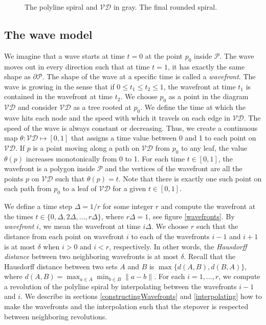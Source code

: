 \documentclass[3p]{elsarticle}
\newcommand{\VD}{\mathcal{VD}}
\newcommand{\PP}{\mathcal{P}}
\newcommand{\stepover}{\delta}
\newcommand{\tStepover}{\Delta}
\begin{document}
\begin{figure*}
\centering
{}\quad
{}
\caption{
 The polyline spiral and $\VD$ in gray.
 The final rounded spiral.
}
\label{firstSpirals}
\end{figure*}

\subsection{The wave model}\label{waveModel}

We imagine that a wave starts at time $t=0$ at the point $p_0$ inside $\PP$. The wave moves out
in every direction such that at time $t=1$, it has exactly the same shape as $\partial\PP$.
The shape of the wave at a specific time is called a \emph{wavefront}.
The wave is growing in the sense that if $0\leq t_1\leq t_2\leq 1$,
the wavefront at time $t_1$ is contained in the wavefront at time $t_2$.
We choose $p_0$ as a point in the diagram $\VD$ and consider $\VD$ as a tree
rooted at $p_0$. We define the time
at which the wave hits each node and the speed with which it travels on each edge in $\VD$.
The speed of the wave is always constant or decreasing.
Thus, we create a continuous map $\theta:\VD\mapsto [0,1]$ that assigns
a time value between 0 and 1 to each point on $\VD$. If $p$ is a point moving along a path
on $\VD$ from $p_0$ to any leaf,
the value $\theta(p)$ increases monotonically from 0 to 1.
For each time $t\in[0,1]$, the wavefront is a polygon inside $\PP$ and the vertices of the wavefront
are all the points $p$ on $\VD$ such that $\theta(p)=t$. Note that there is exactly one such point
on each path from $p_0$ to a leaf of $\VD$ for a given $t\in [0,1]$.

We define a time step $\tStepover = 1/r$ for some
integer $r$ and compute the wavefront at the times
$t\in \{0,\tStepover, 2\tStepover, \ldots, r\tStepover\}$, where $r\tStepover=1$,
see figure \ref{wavefronts}.
By \emph{wavefront} $i$, we mean the wavefront at time $i\tStepover$.
We choose $r$ such that the distance from each point on
wavefront $i$ to each of the wavefronts $i-1$ and $i+1$
is at most $\stepover$ when $i > 0$ and $i<r$, respectively.
In other words, the \emph {Hausdorff distance} between
two neighboring wavefronts is at most $\stepover$.
Recall that the Hausdorff distance between two sets $A$ and $B$ is
$\max\{d(A,B),d(B,A)\}$, where $d(A,B)=\max_{a\in A} \min_{b\in B} \lVert a-b\rVert$.
For each $i=1,\ldots, r$,
we compute a revolution of the polyline spiral by interpolating between the wavefronts $i-1$
and $i$. We describe in sections \ref{constructingWavefronts}
and \ref{interpolating} how to make the wavefronts and the interpolation such
that the stepover is respected between neighboring revolutions.
\end{document}
